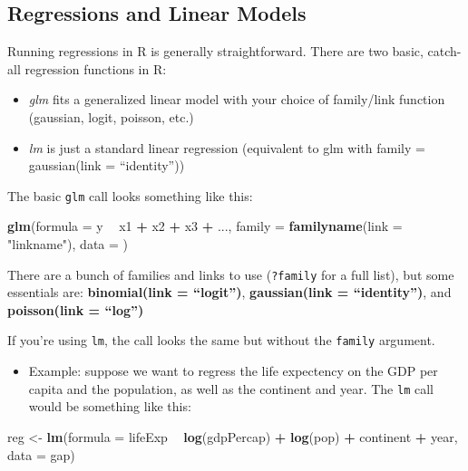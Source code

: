 \documentclass[]{book}
\newenvironment{Shaded}{\begin{snugshade}}{\end{snugshade}}
\newcommand{\KeywordTok}[1]{\textcolor[rgb]{0.13,0.29,0.53}{\textbf{#1}}}
\newcommand{\DataTypeTok}[1]{\textcolor[rgb]{0.13,0.29,0.53}{#1}}
\newcommand{\StringTok}[1]{\textcolor[rgb]{0.31,0.60,0.02}{#1}}
\newcommand{\OperatorTok}[1]{\textcolor[rgb]{0.81,0.36,0.00}{\textbf{#1}}}
\newcommand{\NormalTok}[1]{#1}
\providecommand{\tightlist}{%
  \setlength{\itemsep}{0pt}\setlength{\parskip}{0pt}}
\begin{document}
\subsection{Regressions and Linear
Models}\label{regressions-and-linear-models}

Running regressions in R is generally straightforward. There are two
basic, catch-all regression functions in R:

\begin{itemize}
\item
  \emph{glm} fits a generalized linear model with your choice of
  family/link function (gaussian, logit, poisson, etc.)
\item
  \emph{lm} is just a standard linear regression (equivalent to glm with
  family = gaussian(link = ``identity''))
\end{itemize}

The basic \texttt{glm} call looks something like this:

\begin{Shaded}
\begin{Highlighting}[]
\KeywordTok{glm}\NormalTok{(}\DataTypeTok{formula =}\NormalTok{ y }\OperatorTok{~}\StringTok{ }\NormalTok{x1 }\OperatorTok{+}\StringTok{ }\NormalTok{x2 }\OperatorTok{+}\StringTok{ }\NormalTok{x3 }\OperatorTok{+}\StringTok{ }\NormalTok{..., }\DataTypeTok{family =} \KeywordTok{familyname}\NormalTok{(}\DataTypeTok{link =} \StringTok{"linkname"}\NormalTok{), }\DataTypeTok{data =}\NormalTok{ )}
\end{Highlighting}
\end{Shaded}

There are a bunch of families and links to use (\texttt{?family} for a
full list), but some essentials are: \textbf{binomial(link =
``logit'')}, \textbf{gaussian(link = ``identity'')}, and
\textbf{poisson(link = ``log'')}

If you're using \texttt{lm}, the call looks the same but without the
\texttt{family} argument.

\begin{itemize}
\tightlist
\item
  Example: suppose we want to regress the life expectency on the GDP per
  capita and the population, as well as the continent and year. The
  \texttt{lm} call would be something like this:
\end{itemize}

\begin{Shaded}
\begin{Highlighting}[]
\NormalTok{reg <-}\StringTok{ }\KeywordTok{lm}\NormalTok{(}\DataTypeTok{formula =}\NormalTok{ lifeExp }\OperatorTok{~}\StringTok{ }\KeywordTok{log}\NormalTok{(gdpPercap) }\OperatorTok{+}\StringTok{ }\KeywordTok{log}\NormalTok{(pop) }\OperatorTok{+}\StringTok{ }\NormalTok{continent }\OperatorTok{+}\StringTok{ }\NormalTok{year, }\DataTypeTok{data =}\NormalTok{ gap)}
\end{Highlighting}
\end{Shaded}
\end{document}
